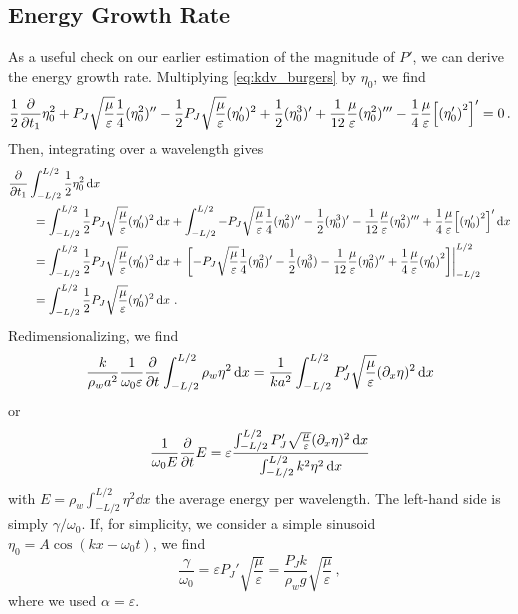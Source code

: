 \documentclass{jfm}
\let\Oldsubsection\subsection
\renewcommand{\subsection}{\FloatBarrier\Oldsubsection}
\renewcommand*{\epsilon}{\varepsilon}
\begin{document}
\subsection{Energy Growth Rate \label{sec:energy_growth_rate}}
As a useful check on our earlier estimation of the magnitude of $P'$, we
can derive the energy growth rate.
Multiplying \cref{eq:kdv_burgers} by $\eta_0$, we find
\begin{equation}
  \frac{1}{2} \pdv{t_1} \eta_0^2 + P_J \sqrt{\frac{\mu}{\epsilon}}
  \frac{1}{4} (\eta_0^2)'' - \frac{1}{2} P_J \sqrt{\frac{\mu}{\epsilon}}
  (\eta_0')^2 + \frac{1}{2} (\eta_0^3)' + \frac{1}{12}
  \frac{\mu}{\epsilon} (\eta_0^2)''' - \frac{1}{4} \frac{\mu}{\epsilon}
  \bqty{\pqty{\eta_0'}^2}' = 0 \,.
\end{equation}
Then, integrating over a wavelength gives
\begin{equation}
  \begin{split}
  &\pdv{t_1} \int_{-L/2}^{L/2} \frac{1}{2} \eta_0^2 \dd{x} \\
  &\qquad= \int_{-L/2}^{L/2} \frac{1}{2} P_J \sqrt{\frac{\mu}{\epsilon}}
    (\eta_0')^2 \dd{x} + \int_{-L/2}^{L/2} -P_J
    \sqrt{\frac{\mu}{\epsilon}} \frac{1}{4} (\eta_0^2)'' - \frac{1}{2}
    (\eta_0^3)' - \frac{1}{12} \frac{\mu}{\epsilon} (\eta_0^2)''' +
    \frac{1}{4} \frac{\mu}{\epsilon} \bqty{\pqty{\eta_0'}^2}' \dd{x}
  \\
  &\qquad=
  \int_{-L/2}^{L/2} \frac{1}{2} P_J \sqrt{\frac{\mu}{\epsilon}}
  (\eta_0')^2 \dd{x} + \eval{\bqty{-P_J \sqrt{\frac{\mu}{\epsilon}}
      \frac{1}{4} (\eta_0^2)' - \frac{1}{2} (\eta_0^3) - \frac{1}{12}
      \frac{\mu}{\epsilon} (\eta_0^2)'' + \frac{1}{4}
      \frac{\mu}{\epsilon} \pqty{\eta_0'}^2}}_{-L/2}^{L/2}
  \\
  &\qquad=
  \int_{-L/2}^{L/2} \frac{1}{2} P_J \sqrt{\frac{\mu}{\epsilon}}
  (\eta_0')^2 \dd{x} \,.
  \end{split}
\end{equation}
Redimensionalizing, we find
\begin{equation}
  \frac{k}{\rho_w a^2} \frac{1}{\omega_0 \epsilon} \pdv{t} \int_{-L/2}^{L/2}
  \rho_w \eta^2 \dd{x} = \frac{1}{k a^2} \int_{-L/2}^{L/2} P_J'
  \sqrt{\frac{\mu}{\epsilon}} (\partial_x \eta)^2 \dd{x}
\end{equation}
or
\begin{equation}
  \frac{1}{\omega_0 E} \pdv{t} E =
  \epsilon
  \frac{
    \int_{-L/2}^{L/2} P_J' \sqrt{\frac{\mu}{\epsilon}} (\partial_x
    \eta)^2 \dd{x}
  }
  {
    \int_{-L/2}^{L/2} k^2 \eta^2 \dd{x}
  }
\end{equation}
with $E = \rho_w \int_{-L/2}^{L/2} \eta^2 \dd{x}$ the average
energy per wavelength.
The left-hand side is simply $\gamma/\omega_0$.
If, for simplicity, we consider a simple sinusoid $\eta_0 = A \cos(k x -
\omega_0 t)$, we find
\begin{equation}
  \frac{\gamma}{\omega_0} = \epsilon P_J' \sqrt{\frac{\mu}{\epsilon}} =
  \frac{P_J k}{\rho_w g} \sqrt{\frac{\mu}{\epsilon}} \,,
\end{equation}
where we used $\alpha = \epsilon$.
\end{document}

